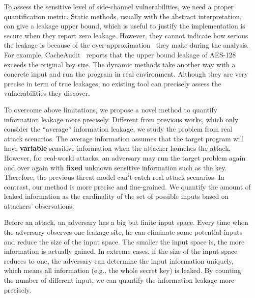 To assess the sensitive level of side-channel vulnerabilities, we need a proper 
quantification metric.
Static methods, usually with the abstract interpretation, can give a leakage upper bound, 
which is useful to justify the implementation is secure when they report zero leakage. 
However, they cannot indicate how serious the leakage is because of the over-approximation~\cite{}
they make during the analysis. 
For example, CacheAudit~\cite{} reports that the upper bound leakage of AES-128 exceeds 
the original key size. The dynamic methods take another way with a concrete input and 
run the program in real environment. Although they are very precise in term of true leakages, 
no existing tool can precisely assess the vulnerabilities they discover.

To overcome above limitations, we propose a novel method
to quantify information leakage more precisely. 
Different from previous works, which only consider the
``average'' information leakage, we study the problem from real attack scenarios.
The average information assumes that the target program will have \textbf{variable} sensitive 
information when the attacker launches the attack.
However, for real-world attacks, an adversary may run the target problem again and over again 
with \textbf{fixed} unknown sensitive information such as the key. 
Therefore, the previous threat model can't catch real attack scenarios.
In contrast, our method is more precise and fine-grained. 
We quantify the amount of leaked information as the cardinality of the set of possible inputs 
based on attackers' observations. 

Before an attack, an adversary has a big but finite input space.
Every time when the adversary observes one leakage site, he can eliminate some 
potential inputs and reduce the size of the input space. 
The smaller the input space is, the more information is actually gained. 
In extreme cases, if the size of the input space reduces to one, 
the adversary can determine the input information uniquely, which means all information
(e.g., the whole secret key) is leaked. By counting the number of different input, 
we can quantify the information leakage more precisely.

